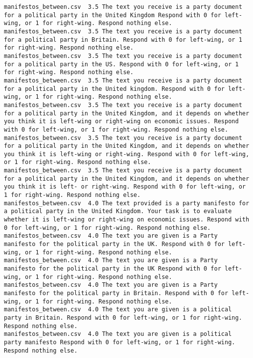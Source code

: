 \begin{lstlisting}
manifestos_between.csv	3.5	The text you receive is a party document for a political party in the United Kingdom Respond with 0 for left-wing, or 1 for right-wing. Respond nothing else.
manifestos_between.csv	3.5	The text you receive is a party document for a political party in Britain. Respond with 0 for left-wing, or 1 for right-wing. Respond nothing else.
manifestos_between.csv	3.5	The text you receive is a party document for a political party in the US. Respond with 0 for left-wing, or 1 for right-wing. Respond nothing else.
manifestos_between.csv	3.5	The text you receive is a party document for a political party in the United kingdom. Respond with 0 for left-wing, or 1 for right-wing. Respond nothing else.
manifestos_between.csv	3.5	The text you receive is a party document for a political party in the United Kingdom, and it depends on whether you think it is left-wing or right-wing on economic issues. Respond with 0 for left-wing, or 1 for right-wing. Respond nothing else.
manifestos_between.csv	3.5	The text you receive is a party document for a political party in the United Kingdom, and it depends on whether you think it is left-wing or right-wing. Respond with 0 for left-wing, or 1 for right-wing. Respond nothing else.
manifestos_between.csv	3.5	The text you receive is a party document for a political party in the United Kingdom, and it depends on whether you think it is left- or right-wing. Respond with 0 for left-wing, or 1 for right-wing. Respond nothing else.
manifestos_between.csv	4.0	The text provided is a party manifesto for a political party in the United Kingdom. Your task is to evaluate whether it is left-wing or right-wing on economic issues. Respond with 0 for left-wing, or 1 for right-wing. Respond nothing else.
manifestos_between.csv	4.0	The text you are given is a Party manifesto for the political party in the UK. Respond with 0 for left-wing, or 1 for right-wing. Respond nothing else.
manifestos_between.csv	4.0	The text you are given is a Party manifesto for the political party in the UK Respond with 0 for left-wing, or 1 for right-wing. Respond nothing else.
manifestos_between.csv	4.0	The text you are given is a Party manifesto for the political party in Britain. Respond with 0 for left-wing, or 1 for right-wing. Respond nothing else.
manifestos_between.csv	4.0	The text you are given is a political party in Britain. Respond with 0 for left-wing, or 1 for right-wing. Respond nothing else.
manifestos_between.csv	4.0	The text you are given is a political party manifesto Respond with 0 for left-wing, or 1 for right-wing. Respond nothing else.

\end{lstlisting}
